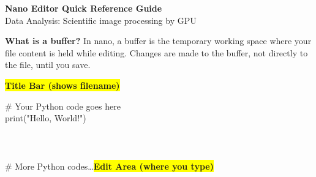 \documentclass[11pt, a4paper, landscape]{article}
\begin{document}
\begin{center}
    {\LARGE\textbf{Nano Editor Quick Reference Guide}}\\[3pt]
    {\small\color{gray}Data Analysis: Scientific image processing by GPU}
\end{center}

\vspace{3pt}

\begin{minipage}[t]{0.48\textwidth}
    \begin{tcolorbox}[colback=lightgray!30, colframe=gray!50, title={\textbf{1. Opening Nano}}, fonttitle=\normalsize\bfseries]
        \vspace{-5pt}
        \colorbox{darkblue}{}

        \vspace{3pt}
        \textbf{What is a buffer?} In nano, a buffer is the temporary working space where your file content is held while editing. Changes are made to the buffer, not directly to the file, until you save.

        \vspace{5pt}
        \begin{minipage}{\textwidth}
            \hfill\colorbox{yellow}{\color{black}\footnotesize\textbf{Title Bar (shows filename)}}

            \vspace{1pt}
            \begin{tcolorbox}[colback=black, colframe=darkgray, boxrule=1pt, arc=2pt, left=0pt, right=0pt, top=0pt, bottom=0pt]
                \colorbox{darkgray}{}

                \vspace{2pt}
                \color{white}\ttfamily\footnotesize
                \# Your Python code goes here\\
                print("Hello, World!")\\
                \\
                \\
                \\
                \# More Python codes\ldots\hfill\colorbox{yellow}{\color{black}\footnotesize\textbf{Edit Area (where you type)}}


\end{tcolorbox}
\end{minipage}
\end{tcolorbox}
\end{minipage}
\end{document}
